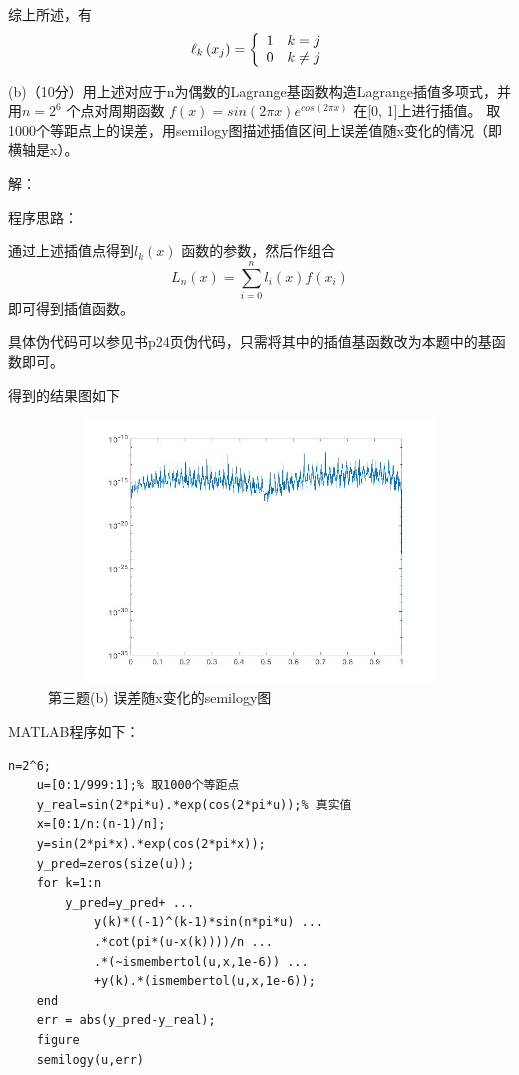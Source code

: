 \documentclass[12pt,a4paper,utf8]{ctexart}
\begin{document}
\begin{enumerate}
综上所述，有
\begin{equation}
    \ell_{k}\left(x_{j}\right)=\left\{\begin{array}{ll}
    1 & k=j \\
    0 & k \neq j
    \end{array}\right.\notag
\end{equation}


(b)（10分）用上述对应于n为偶数的Lagrange基函数构造Lagrange插值多项式，并用$ n = 2^6 $ 个点对周期函数
$ f(x) = sin(2πx)e^{cos(2πx)} $ 在[0, 1]上进行插值。
取1000个等距点上的误差，用semilogy图描述插值区间上误差值随x变化的情况（即横轴是x）。

解：

程序思路：

通过上述插值点得到$ l_k(x) $ 函数的参数，然后作组合
$$ L_n(x)=\sum_{i=0}^{n}l_i(x)f(x_i) $$
即可得到插值函数。

具体伪代码可以参见书p24页伪代码，只需将其中的插值基函数改为本题中的基函数即可。

\newpage
得到的结果图如下
\begin{figure}[h]
    \centering
    \includegraphics[width=15cm,height=7cm]{ex3b.jpg}
    \caption{第三题(b) 误差随x变化的semilogy图}
 \end{figure}


MATLAB程序如下：
\begin{lstlisting}[frame=single]
    n=2^6;
    u=[0:1/999:1];% 取1000个等距点
    y_real=sin(2*pi*u).*exp(cos(2*pi*u));% 真实值
    x=[0:1/n:(n-1)/n];
    y=sin(2*pi*x).*exp(cos(2*pi*x));
    y_pred=zeros(size(u));
    for k=1:n
        y_pred=y_pred+ ...
            y(k)*((-1)^(k-1)*sin(n*pi*u) ...
            .*cot(pi*(u-x(k))))/n ...
            .*(~ismembertol(u,x,1e-6)) ...
            +y(k).*(ismembertol(u,x,1e-6));
    end
    err = abs(y_pred-y_real);
    figure
    semilogy(u,err)
\end{lstlisting}


\end{enumerate}
\end{document}

